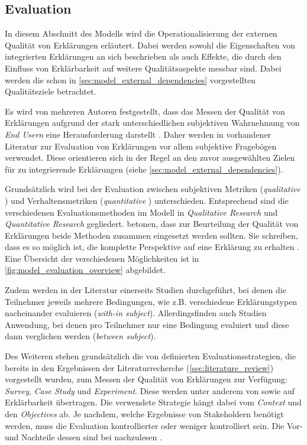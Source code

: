 \subsection{Evaluation}
\label{sec:model_evaluation_description}

In diesem Abschnitt des Modells wird die Operationalisierung der externen Qualität von Erklärungen erläutert. Dabei werden sowohl die Eigenschaften von integrierten Erklärungen an sich beschrieben als auch Effekte, die durch den Einfluss von Erklärbarkeit auf weitere Qualitätsaspekte messbar sind. Dabei werden die schon in \autoref{sec:model_external_dependencies} vorgestellten Qualitätsziele betrachtet.

Es wird von mehreren Autoren festgestellt, dass das Messen der Qualität von Erklärungen aufgrund der stark unterschiedlichen subjektiven Wahrnehmung von \textit{End Usern}  eine Herausforderung darstellt \cite{nunes_systematic_2017, eiband_impact_2019, kouki_user_2017}. Daher werden in vorhandener Literatur zur Evaluation von Erklärungen vor allem subjektive Fragebögen verwendet. Diese orientieren sich in der Regel an den zuvor ausgewählten Zielen für zu integrierende Erklärungen (siehe \autoref{sec:model_external_dependencies}).

Grundsätzlich wird bei der Evaluation zwischen subjektiven Metriken (\textit{qualitative} \cite{wohlin2012experimentation}) und Verhaltensmetriken (\textit{quantitative} \cite{wohlin2012experimentation}) unterschieden. Entsprechend sind die verschiedenen Evaluationsmethoden im Modell in \textit{Qualitative Research} und \textit{Quantitative Research} gegliedert. \citeauthor{waa_evaluating_2021} betonen, dass zur Beurteilung der Qualität von Erklärungen beide Methoden zusammen eingesetzt werden sollten. Sie schreiben, dass es so möglich ist, die \glqq komplette Perspektive\grqq{} auf eine Erklärung zu erhalten \cite[übersetzt vgl.][]{waa_evaluating_2021}. Eine Übersicht der verschiedenen Möglichkeiten ist in \autoref{fig:model_evaluation_overview} abgebildet.

Zudem werden in der Literatur einerseits Studien durchgeführt, bei denen die Teilnehmer jeweils mehrere Bedingungen, wie z.B. verschiedene Erklärungstypen nacheinander evaluieren (\textit{with-in subject}). Allerdingsfinden auch Studien Anwendung, bei denen pro Teilnehmer nur eine Bedingung evaluiert und diese dann verglichen werden (\textit{between subject}).

Des Weiteren stehen grundsätzlich die von \citeauthor{wohlin2012experimentation} definierten Evaluationsstrategien, die bereits in den Ergebnissen der Literaturrecherche (\autoref{sec:literature_review}) vorgestellt wurden, zum Messen der Qualität von Erklärungen zur Verfügung: \textit{Survey}, \textit{Case Study} und \textit{Experiment}. Diese werden unter anderem von \citeauthor{ribera2019can} sowie \citeauthor{doshi2017towards} auf Erklärbarkeit übertragen. Die verwendete Strategie hängt dabei vom \textit{Context} und den \textit{Objectives} ab. Je nachdem, welche Ergebnisse von Stakeholdern benötigt werden, muss die Evaluation kontrollierter oder weniger kontrolliert sein. Die Vor- und Nachteile dessen sind bei \citeauthor{wohlin2012experimentation} nachzulesen \cite{wohlin2012experimentation}.

